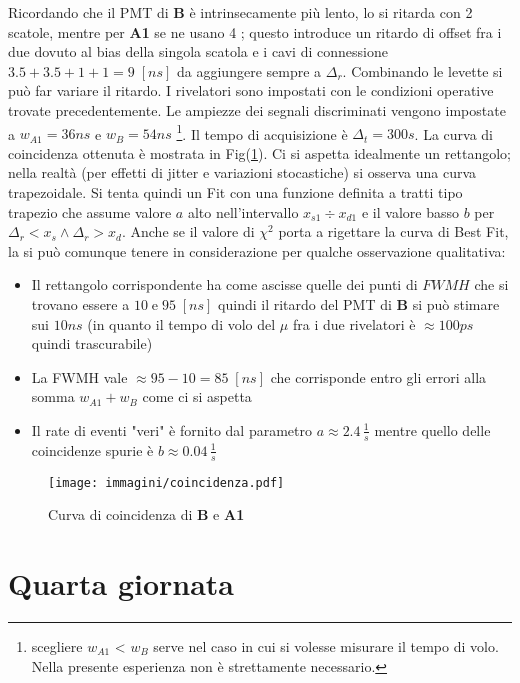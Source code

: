 \documentclass[12pt,a4paper,openright,twoside]{article}
\numberwithin{equation}{section} %
\begin{document}
Ricordando che il PMT di \textbf{B} è intrinsecamente più lento, lo si ritarda con 2 scatole, mentre per \textbf{A1} se ne usano 4 ; questo introduce un ritardo di offset fra i due dovuto al bias della singola scatola e i cavi di connessione $3.5+3.5+1+1=9 \;[ns]$ da aggiungere sempre a $\Delta_{r}$.
Combinando le levette si può far variare il ritardo.
I rivelatori sono impostati con le condizioni operative trovate precedentemente. Le ampiezze dei segnali discriminati vengono impostate a $w_{A1}= 36 ns $ e $w_{B}= 54 ns$ \footnote{scegliere $w_{A1}$ < $w_{B}$ serve nel caso in cui si volesse misurare il tempo di volo. Nella presente esperienza non è strettamente necessario.}. Il tempo di acquisizione è $\Delta_t=300s$.
La curva di coincidenza ottenuta è mostrata in Fig(\ref{curvaco}).
Ci si aspetta idealmente un rettangolo; nella realtà (per effetti di jitter e variazioni stocastiche) si osserva una curva trapezoidale. Si tenta quindi un Fit con una funzione definita a tratti tipo trapezio che assume valore $a$ alto nell'intervallo $x_{s1} \div x_{d1}$ e il valore basso $b$ per $\Delta_r < x_s \wedge \Delta_ r > x_d$.
Anche se il valore di $\chi ^2 $ porta a rigettare la curva di Best Fit, la si può comunque tenere in considerazione per qualche osservazione qualitativa:
\begin{itemize}
\item Il rettangolo corrispondente ha come ascisse quelle dei punti di $FWMH$ che si trovano essere a $10 \; \text{e} \; 95 \; [ns]$ quindi il ritardo del PMT di \textbf{B} si può stimare sui  $10 ns$ (in quanto il tempo di volo del $\mu$ fra i due rivelatori è $\approx 100 ps$ quindi trascurabile)
\item La FWMH vale $\approx 95-10 = 85 \; [ns] $ che corrisponde entro gli errori alla somma $w_{A1}+w_{B}$ come ci si aspetta
\item Il rate di eventi "veri" è fornito dal parametro $a \approx 2.4 \, \frac{1}{s}$ mentre quello delle coincidenze spurie è $b \approx 0.04 \, \frac{1}{s}$

\end{itemize}

\begin{figure}[hbtp]
\centering
\texttt{[image: immagini/coincidenza.pdf]}
\caption{Curva di coincidenza di \textbf{B} e \textbf{A1}}
\label{curvaco}
\end{figure}

\section{Quarta giornata}
\end{document}
